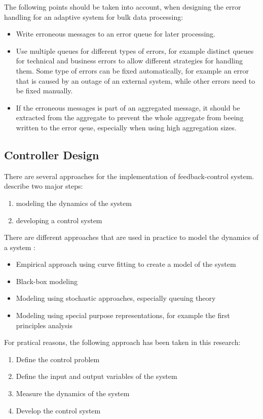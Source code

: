 The following points should be taken into account, when designing the error handling for an adaptive system for bulk data processing:
\begin{itemize}
	\item Write erroneous messages to an error queue for later processing. 
	\item Use multiple queues for different types of errors, for example distinct queues for technical and business errors to allow different strategies for handling them. Some type of errors can be fixed automatically, for example an error that is caused by an outage of an external system, while other errors need to be fixed manually.
	\item If the erroneous messages is part of an aggregated message, it should be extracted from the aggregate to prevent the whole aggregate from beeing written to the error qeue, especially when using high aggregation sizes.
\end{itemize}

\subsection{Controller Design}
\label{sec:ch05_controller_design}

There are several approaches for the implementation of feedback-control system. \cite{Hellerstein:2004a} describe two major steps:
\begin{enumerate}
	\item modeling the dynamics of the system
	\item developing a control system
\end{enumerate}

There are different approaches that are used in practice to model the dynamics of a system \citep{Hellerstein:2004tu}:
\begin{itemize}
	\item Empirical approach using curve fitting to create a model of the system
	\item Black-box modeling
	\item Modeling using stochastic approaches, especially queuing theory
	\item Modeling using special purpose representations, for example the first principles analysis
\end{itemize}

For pratical reasons, the following approach has been taken in this research:

\begin{enumerate}
	\item Define the control problem
	\item Define the input and output variables of the system
	\item Measure the dynamics of the system
	\item Develop the control system
\end{enumerate}

